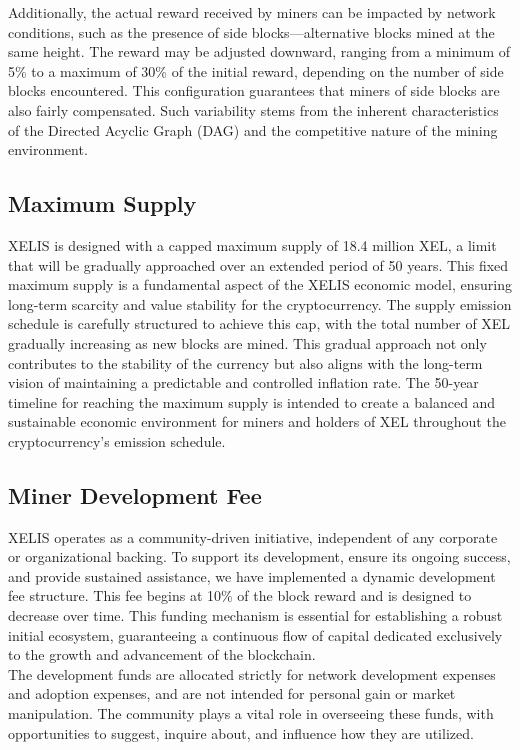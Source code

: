 \documentclass[12pt,a4paper,twocolumn]{article}
\begin{document}
Additionally, the actual reward received by miners can be impacted by network conditions, such as the presence of side blocks—alternative blocks mined at the same height. The reward may be adjusted downward, ranging from a minimum of 5\% to a maximum of 30\% of the initial reward, depending on the number of side blocks encountered. This configuration guarantees that miners of side blocks are also fairly compensated. Such variability stems from the inherent characteristics of the Directed Acyclic Graph (DAG) and the competitive nature of the mining environment.


\subsection{Maximum Supply}
XELIS is designed with a capped maximum supply of 18.4 million XEL, a limit that will be gradually approached over an extended period of 50 years. This fixed maximum supply is a fundamental aspect of the XELIS economic model, ensuring long-term scarcity and value stability for the cryptocurrency. The supply emission schedule is carefully structured to achieve this cap, with the total number of XEL gradually increasing as new blocks are mined. This gradual approach not only contributes to the stability of the currency but also aligns with the long-term vision of maintaining a predictable and controlled inflation rate. The 50-year timeline for reaching the maximum supply is intended to create a balanced and sustainable economic environment for miners and holders of XEL throughout the cryptocurrency's emission schedule.
\subsection{Miner Development Fee}

XELIS operates as a community-driven initiative, independent of any corporate or organizational backing. To support its development, ensure its ongoing success, and provide sustained assistance, we have implemented a dynamic development fee structure. This fee begins at 10\% of the block reward and is designed to decrease over time. This funding mechanism is essential for establishing a robust initial ecosystem, guaranteeing a continuous flow of capital dedicated exclusively to the growth and advancement of the blockchain.\\

The development funds are allocated strictly for network development expenses and adoption expenses, and are not intended for personal gain or market manipulation. The community plays a vital role in overseeing these funds, with opportunities to suggest, inquire about, and influence how they are utilized.\\
\end{document}
